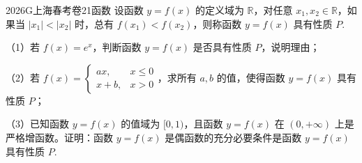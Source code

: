 
\begin{problem}{2026}{G}{上海春考卷}{21}{函数}
设函数 $y=f(x)$ 的定义域为 $\mathbb{R}$，对任意 $x_1, x_2 \in \mathbb{R}$，如果当 $|x_1| < |x_2|$ 时，总有 $f(x_1) < f(x_2)$，则称函数 $y=f(x)$ 具有性质 $P$.

（1）若 $f(x)=e^x$，判断函数 $y=f(x)$ 是否具有性质 $P$，说明理由；

（2）若 $f(x)=\begin{cases} ax, & x \le 0 \\ x+b, & x > 0 \end{cases}$，求所有 $a, b$ 的值，使得函数 $y=f(x)$ 具有性质 $P$；

（3）已知函数 $y=f(x)$ 的值域为 $[0, 1)$，且函数 $y=f(x)$ 在 $(0, +\infty)$ 上是严格增函数。证明：函数 $y=f(x)$ 是偶函数的充分必要条件是函数 $y=f(x)$ 具有性质 $P$.
\end{problem}

\begin{answer}
\end{answer}

\begin{solutions}
\end{solutions}